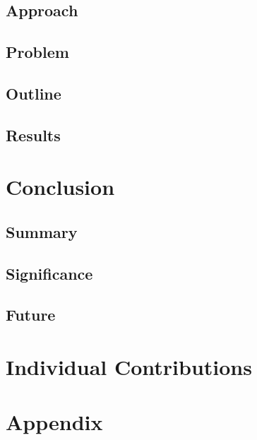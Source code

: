 \documentclass[conf]{new-aiaa}
\begin{document}
\subsection{Approach}

\subsection{Problem}

\subsection{Outline}

\subsection{Results}

\section{Conclusion}

\subsection{Summary}

\subsection{Significance}

\subsection{Future}

\section{Individual Contributions}

\section*{Appendix}


\end{document}
